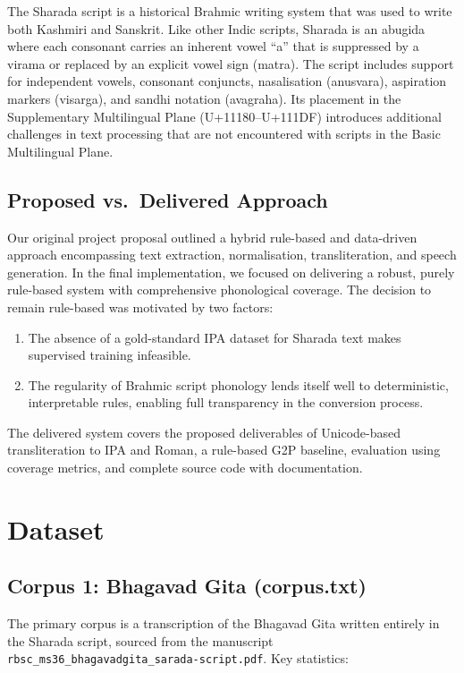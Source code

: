 \documentclass[11pt]{article}
\begin{document}
The Sharada script is a historical Brahmic writing system that was used to write both Kashmiri and Sanskrit. Like other Indic scripts, Sharada is an abugida where each consonant carries an inherent vowel ``a'' that is suppressed by a virama or replaced by an explicit vowel sign (matra). The script includes support for independent vowels, consonant conjuncts, nasalisation (anusvara), aspiration markers (visarga), and sandhi notation (avagraha). Its placement in the Supplementary Multilingual Plane (U+11180--U+111DF) introduces additional challenges in text processing that are not encountered with scripts in the Basic Multilingual Plane.

\subsection{Proposed vs.\ Delivered Approach}
Our original project proposal outlined a hybrid rule-based and data-driven approach encompassing text extraction, normalisation, transliteration, and speech generation. In the final implementation, we focused on delivering a robust, purely rule-based system with comprehensive phonological coverage. The decision to remain rule-based was motivated by two factors:
\begin{enumerate}
    \item The absence of a gold-standard IPA dataset for Sharada text makes supervised training infeasible.
    \item The regularity of Brahmic script phonology lends itself well to deterministic, interpretable rules, enabling full transparency in the conversion process.
\end{enumerate}

The delivered system covers the proposed deliverables of Unicode-based transliteration to IPA and Roman, a rule-based G2P baseline, evaluation using coverage metrics, and complete source code with documentation.

\section{Dataset}

\subsection{Corpus 1: Bhagavad Gita (corpus.txt)}
The primary corpus is a transcription of the Bhagavad Gita written entirely in the Sharada script, sourced from the manuscript \texttt{rbsc\_ms36\_bhagavadgita\_sarada-script.pdf}. Key statistics:
\end{document}

